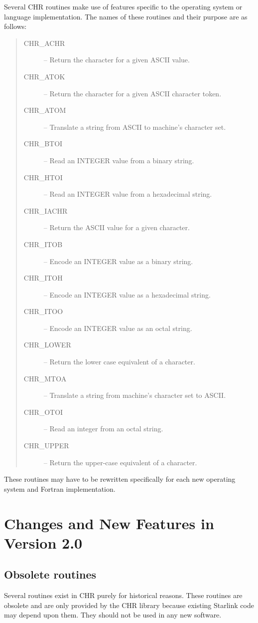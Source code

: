 Several CHR routines make use of features specific to the operating system or 
language implementation.
The names of these routines and their purpose are as follows:

\begin {quote}
\begin{description}
\item [CHR\_ACHR] -- Return the character for a given ASCII value.
\item [CHR\_ATOK] -- Return the character for a given ASCII character token.
\item [CHR\_ATOM] -- Translate a string from ASCII to machine's character set.
\item [CHR\_BTOI] -- Read an INTEGER value from a binary string.
\item [CHR\_HTOI] -- Read an INTEGER value from a hexadecimal string.
\item [CHR\_IACHR] -- Return the ASCII value for a given character.
\item [CHR\_ITOB] -- Encode an INTEGER value as a binary string.
\item [CHR\_ITOH] -- Encode an INTEGER value as a hexadecimal string.
\item [CHR\_ITOO] -- Encode an INTEGER value as an octal string.
\item [CHR\_LOWER] -- Return the lower case equivalent of a character.
\item [CHR\_MTOA] -- Translate a string from machine's character set to ASCII.
\item [CHR\_OTOI] -- Read an integer from an octal string.
\item [CHR\_UPPER] -- Return the upper-case equivalent of a character.
\end {description}
\end {quote}

These routines may have to be rewritten specifically for each new 
operating system and Fortran implementation.


\section {Changes and New Features in Version 2.0}

\subsection {Obsolete routines}

Several routines exist in CHR purely for historical reasons.
These routines are obsolete and are only provided by the CHR library because
existing Starlink code may depend upon them.
They should not be used in any new software.

